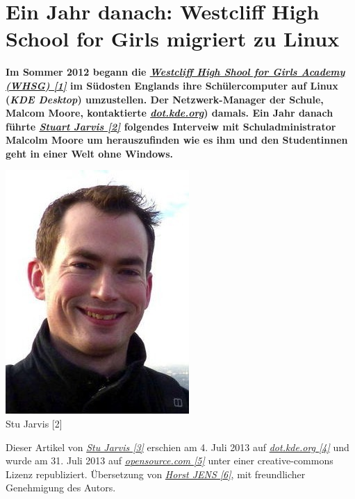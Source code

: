 \section*{Ein Jahr danach: Westcliff High School for Girls migriert zu Linux} 
\label{westcliff}

\textbf{Im Sommer 2012 begann die \href{http://www.whsg.info/index.php/extracurricular/it-and-software/open-source-software}{\textit{Westcliff High Shool for Girls Academy (WHSG) [1]}} im Südosten Englands ihre Schülercomputer auf Linux (\textit{KDE Desktop}) umzustellen. Der Netzwerk-Manager der Schule, Malcom Moore, kontaktierte \href{http://dot.kde.org/}{\textit{dot.kde.org}}) damals. Ein Jahr danach führte \href{http://dot.kde.org/users/stuart-jarvis}{\textit{Stuart Jarvis [2]}} folgendes Interveiw mit Schuladministrator Malcolm Moore um herauszufinden wie es ihm und den Studentinnen geht in einer Welt ohne Windows.}

\begin{center}
\includegraphics[width=0.5\linewidth]{westcliff/westcliff-stu.jpg}\\
\footnotesize{Stu Jarvis [2]}
\end{center}

Dieser Artikel von \href{http://www.asinen.org/about/}{\textit{Stu Jarvis [3]}} erschien am 4. Juli 2013 auf \href{http://dot.kde.org/2013/07/04/year-linux-desktop}{\textit{dot.kde.org [4]}} und wurde am 31. Juli 2013 auf \href{http://opensource.com/education/13/7/linux-westcliff-high-school}{\textit{opensource.com [5]}} unter einer creative-commons Lizenz republiziert. Übersetzung von \href{http://spielend-programmieren.at}{\textit{Horst JENS [6]}}, mit freundlicher Genehmigung des Autors.

